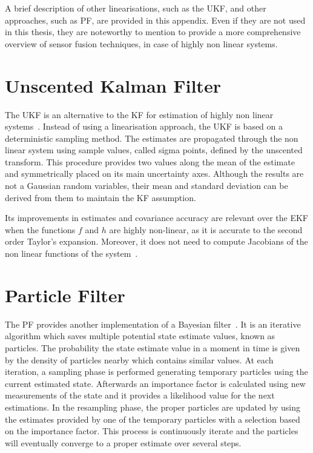 A brief description of other linearisations, such as the \gls{UKF}, and other approaches, such as \gls{PF}, are provided in this appendix.
Even if they are not used in this thesis, they are noteworthy to mention to provide a more comprehensive overview of sensor fusion techniques, in case of highly non linear systems.

\section{Unscented Kalman Filter}
\label{sec:ukf}
\noindent The \gls{UKF} is an alternative to the \gls{KF} for estimation of highly non linear systems~\cite{unscentedK}.
Instead of using a linearisation approach, the \gls{UKF} is based on a deterministic sampling method.
The estimates are propagated through the non linear system using sample values, called sigma points, defined by the unscented transform.
This procedure provides two values along the mean of the estimate and symmetrically placed on its main uncertainty axes.
Although the results are not a Gaussian random variables, their mean and standard deviation can be derived from them to maintain the \gls{KF} assumption.

Its improvements in estimates and covariance accuracy are relevant over the \gls{EKF} when the functions $f$ and $h$ are highly non-linear, as it is accurate to the second order Taylor's expansion.
Moreover, it does not need to compute Jacobians of the non linear functions of the system~\cite{thrun_probabilistic_2005}.



\section{Particle Filter}
\label{sec:pf}
\noindent The \gls{PF} provides another implementation of a Bayesian filter~\cite{particle}.
It is an iterative algorithm which saves multiple potential state estimate values, known as particles.
The probability the state estimate value in a moment in time is given by the density of particles nearby which contains similar values.
At each iteration, a sampling phase is performed generating temporary particles using the current estimated state.
Afterwards an importance factor is calculated using new measurements of the state and it provides a likelihood value for the next estimations.
In the resampling phase, the proper particles are updated by using the estimates provided by one of the temporary particles with a selection based on the importance factor.
This process is continuously iterate and the particles will eventually converge to a proper estimate over several steps.

